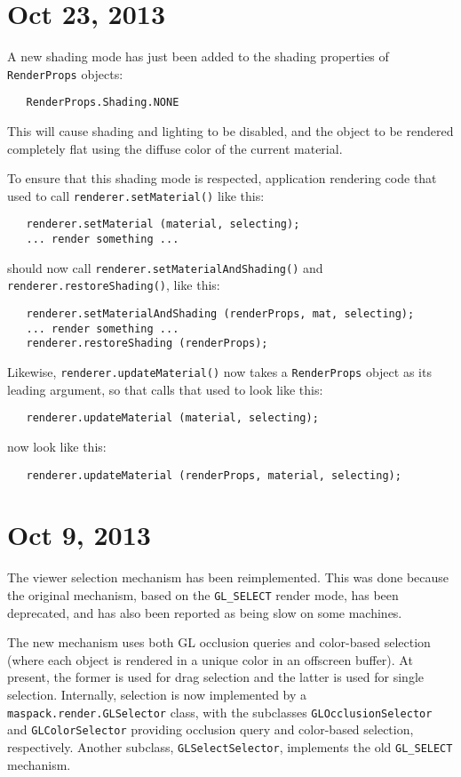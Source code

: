 \documentclass{article}
\begin{document}
\section*{Oct 23, 2013}

A new shading mode has just been added to the shading properties
of {\tt RenderProps} objects:
\begin{verbatim}
   RenderProps.Shading.NONE
\end{verbatim}
This will cause shading and lighting to be disabled, and the
object to be rendered completely flat using the diffuse
color of the current material.

To ensure that this shading mode is respected, application
rendering code that used to call {\tt renderer.setMaterial()} like this:
\begin{lstlisting}
   renderer.setMaterial (material, selecting);
   ... render something ...
\end{lstlisting}
should now call {\tt renderer.setMaterialAndShading()} and 
{\tt renderer.restoreShading()},
like this:
\begin{lstlisting}
   renderer.setMaterialAndShading (renderProps, mat, selecting);
   ... render something ...
   renderer.restoreShading (renderProps);
\end{lstlisting}
Likewise, {\tt renderer.updateMaterial()} now takes a {\tt RenderProps}
object as its leading argument, so that calls that used to
look like this:
\begin{lstlisting}
   renderer.updateMaterial (material, selecting);
\end{lstlisting}
now look like this:
\begin{lstlisting}
   renderer.updateMaterial (renderProps, material, selecting);
\end{lstlisting}

\section*{Oct 9, 2013}

The viewer selection mechanism has been reimplemented. This was done
because the original mechanism, based on the {\tt GL\_SELECT} render
mode, has been deprecated, and has also been reported as being slow on
some machines.

The new mechanism uses both GL occlusion queries and color-based
selection (where each object is rendered in a unique color in an
offscreen buffer). At present, the former is used for drag selection
and the latter is used for single selection. Internally, selection is
now implemented by a {\tt maspack.render.GLSelector} class, with the
subclasses {\tt GLOcclusionSelector} and {\tt GLColorSelector}
providing occlusion query and color-based selection,
respectively. Another subclass, {\tt GLSelectSelector}, implements the
old {\tt GL\_SELECT} mechanism.
\end{document}
